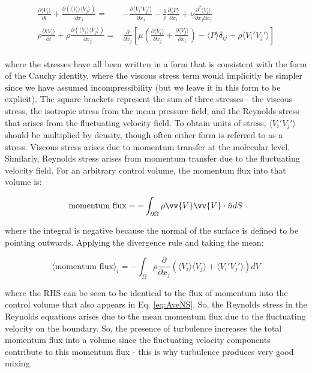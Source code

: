 \documentclass[10pt]{article}
\newcommand{\beq}{\begin{equation}}
\newcommand{\eeq}{\end{equation}}
\newcommand{\beqa}{\begin{equation}\begin{aligned}}
\newcommand{\eeqa}{\end{aligned}\end{equation}}
\newcommand{\la}{\langle}
\newcommand{\ra}{\rangle}
\begin{document}
\begin{flushleft}
\beqa
\label{eq:RewrittenMom}
\frac{\partial \la V_i\ra}{\partial t}+\frac{\partial(\la V_i\ra\la V_j\ra)}{\partial x_j}=&-\frac{\partial\la V_i'V_j'\ra}{\partial x_j}-\frac{1}{\rho}\frac{\partial \la P\ra}{\partial x_i}+\nu\frac{\partial^2 \la V_i\ra}{\partial x_j\partial x_j}\\
\rho\frac{\partial \la V_i\ra}{\partial t}+\rho\frac{\partial(\la V_i\ra\la V_j\ra)}{\partial x_j}=&\frac{\partial}{\partial x_j}\left\lbrack\mu\left(\frac{\partial\la V_i\ra}{\partial x_j}+\frac{\partial\la V_j\ra}{\partial x_i}\right)-\la P\ra\delta_{ij}-\rho\la V_i'V_j'\ra\right\rbrack\\
\eeqa

where the stresses have all been written in a form that is consistent with the form of the Cauchy identity, where the viscous stress term would implicitly be simpler since we have assumed incompressibility (but we leave it in this form to be explicit). The square brackets represent the sum of three stresses - the viscous stress, the isotropic stress from the mean pressure field, and the Reynolds stress that arises from the fluctuating velocity field. To obtain units of stress, \(\la V_i'V_j'\ra\) should be multiplied by density, though often either form is referred to as a stress. Viscous stress arises due to momentum transfer at the molecular level. Similarly, Reynolds stress arises from momentum transfer due to the fluctuating velocity field. For an arbitrary control volume, the momentum flux into that volume is:

\beq
\textrm{momentum flux}=-\int_{\partial\Omega}\rho\vv{V}\vv{V}\cdot\hat{n}dS
\eeq

where the integral is negative because the normal of the surface is defined to be pointing outwards. Applying the divergence rule and taking the mean:

\beq
\la\textrm{momentum flux}\ra_i=-\int_{\Omega}\rho\frac{\partial}{\partial x_j}\left(\la V_i\ra\la V_j\ra+\la V_i'V_j'\ra\right)dV
\eeq

where the RHS can be seen to be identical to the flux of momentum into the control volume that also appears in Eq. \eqref{eq:AveNS}. So, the Reynolds stress in the Reynolds equations arises due to the mean momentum flux due to the fluctuating velocity on the boundary. So, the presence of turbulence increases the total momentum flux into a volume since the fluctuating velocity components contribute to this momentum flux - this is why turbulence produces very good mixing. 


\end{flushleft}
\end{document}
